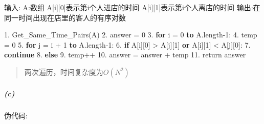 \documentclass[
]{article}
\newenvironment{Shaded}{}{}
\newcommand{\DecValTok}[1]{\textcolor[rgb]{0.25,0.63,0.44}{#1}}
\newcommand{\KeywordTok}[1]{\textcolor[rgb]{0.00,0.44,0.13}{\textbf{#1}}}
\newcommand{\NormalTok}[1]{#1}
\begin{document}
\begin{Shaded}
\begin{Highlighting}[]
\NormalTok{输入:}
\NormalTok{A:数组}
\NormalTok{  A[i][}\DecValTok{0}\NormalTok{]表示第i个人进店的时间}
\NormalTok{  A[i][}\DecValTok{1}\NormalTok{]表示第i个人离店的时间}
\NormalTok{输出:在同一时间出现在店里的客人的有序对数}

\DecValTok{1.}\NormalTok{ Get\_Same\_Time\_Pairs(A)}
\DecValTok{2.}\NormalTok{   answer = }\DecValTok{0}
\DecValTok{3.}   \KeywordTok{for}\NormalTok{ i = }\DecValTok{0} \KeywordTok{to}\NormalTok{ A.length}\DecValTok{{-}1}\NormalTok{:}
\DecValTok{4.}\NormalTok{  	 temp = }\DecValTok{0}
\DecValTok{5.}     \KeywordTok{for}\NormalTok{ j = i + }\DecValTok{1} \KeywordTok{to}\NormalTok{ A.length}\DecValTok{{-}1}\NormalTok{:}
\DecValTok{6.}    	 \KeywordTok{if}\NormalTok{ A[i][}\DecValTok{0}\NormalTok{] \textgreater{} A[j][}\DecValTok{1}\NormalTok{] }\KeywordTok{or}\NormalTok{ A[i][}\DecValTok{1}\NormalTok{] \textless{} A[j][}\DecValTok{0}\NormalTok{]:}
\DecValTok{7.}         \KeywordTok{continue}
\DecValTok{8.}       \KeywordTok{else}
\DecValTok{9.}\NormalTok{         temp++}
\DecValTok{10.}\NormalTok{    answer = answer + temp}
\DecValTok{11.}\NormalTok{  return answer}
\end{Highlighting}
\end{Shaded}

\begin{quote}
两次遍历，时间复杂度为\(O(N^2)\)
\end{quote}

\hypertarget{header-n12}{%
\subparagraph{(c)}\label{header-n12}}

伪代码:
\end{document}
